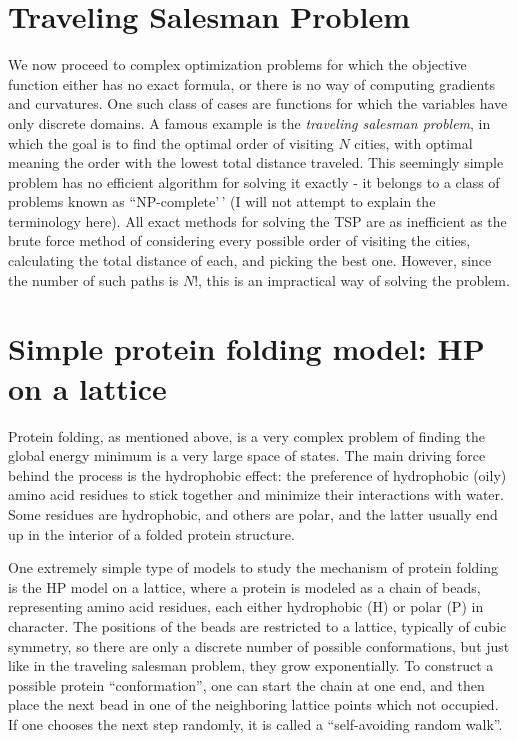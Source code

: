 \documentclass[
  letterpaper,
  DIV=11,
  numbers=noendperiod]{scrreprt}
\begin{document}
\section{Traveling Salesman Problem}\label{traveling-salesman-problem}

We now proceed to complex optimization problems for which the objective
function either has no exact formula, or there is no way of computing
gradients and curvatures. One such class of cases are functions for
which the variables have only discrete domains. A famous example is the
\emph{traveling salesman problem}, in which the goal is to find the
optimal order of visiting \(N\) cities, with optimal meaning the order
with the lowest total distance traveled. This seemingly simple problem
has no efficient algorithm for solving it exactly - it belongs to a
class of problems known as ``NP-complete'\,' (I will not attempt to
explain the terminology here). All exact methods for solving the TSP are
as inefficient as the brute force method of considering every possible
order of visiting the cities, calculating the total distance of each,
and picking the best one. However, since the number of such paths is
\(N!\), this is an impractical way of solving the problem.

\section{Simple protein folding model: HP on a
lattice}\label{simple-protein-folding-model-hp-on-a-lattice}

Protein folding, as mentioned above, is a very complex problem of
finding the global energy minimum is a very large space of states. The
main driving force behind the process is the hydrophobic effect: the
preference of hydrophobic (oily) amino acid residues to stick together
and minimize their interactions with water. Some residues are
hydrophobic, and others are polar, and the latter usually end up in the
interior of a folded protein structure.

One extremely simple type of models to study the mechanism of protein
folding is the HP model on a lattice, where a protein is modeled as a
chain of beads, representing amino acid residues, each either
hydrophobic (H) or polar (P) in character. The positions of the beads
are restricted to a lattice, typically of cubic symmetry, so there are
only a discrete number of possible conformations, but just like in the
traveling salesman problem, they grow exponentially. To construct a
possible protein ``conformation'', one can start the chain at one end,
and then place the next bead in one of the neighboring lattice points
which not occupied. If one chooses the next step randomly, it is called
a ``self-avoiding random walk''.
\end{document}
